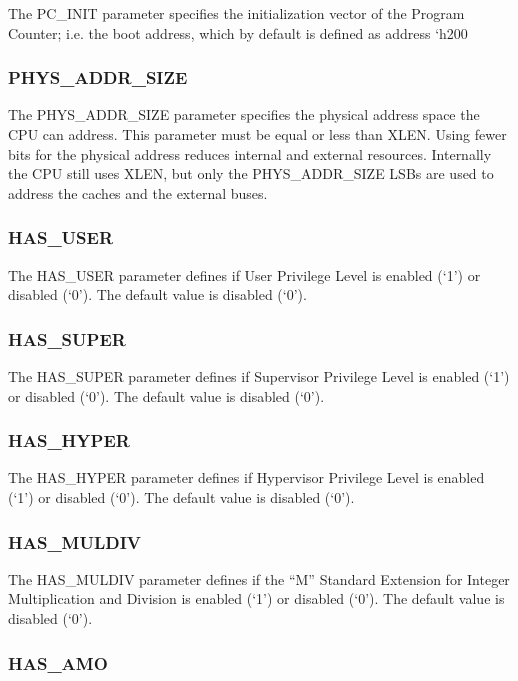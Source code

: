 The PC\_INIT parameter specifies the initialization vector of the
Program Counter; i.e. the boot address, which by default is defined as
address `h200

\subsubsection{PHYS\_ADDR\_SIZE}\label{phys_addr_size}

The PHYS\_ADDR\_SIZE parameter specifies the physical address space the
CPU can address. This parameter must be equal or less than XLEN. Using
fewer bits for the physical address reduces internal and external
resources. Internally the CPU still uses XLEN, but only the
PHYS\_ADDR\_SIZE LSBs are used to address the caches and the external
buses.

\subsubsection{HAS\_USER}\label{has_user}

The HAS\_USER parameter defines if User Privilege Level is enabled (`1')
or disabled (`0'). The default value is disabled (`0').

\subsubsection{HAS\_SUPER}\label{has_super}

The HAS\_SUPER parameter defines if Supervisor Privilege Level is
enabled (`1') or disabled (`0'). The default value is disabled (`0').

\subsubsection{HAS\_HYPER}\label{has_hyper}

The HAS\_HYPER parameter defines if Hypervisor Privilege Level is
enabled (`1') or disabled (`0'). The default value is disabled (`0').

\subsubsection{HAS\_MULDIV}\label{has_muldiv}

The HAS\_MULDIV parameter defines if the ``M'' Standard Extension for
Integer Multiplication and Division is enabled (`1') or disabled (`0').
The default value is disabled (`0').

\subsubsection{HAS\_AMO}\label{has_amo}

